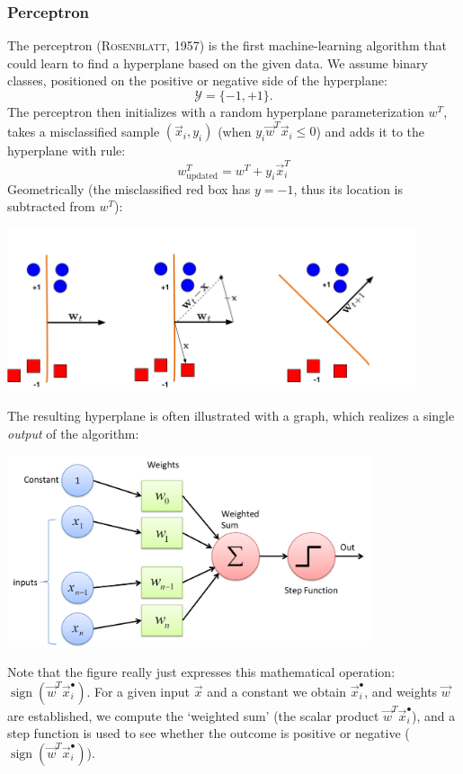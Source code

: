 \documentclass{article}
\DeclareMathOperator{\sign}{sign}
\begin{document}
\subsubsection{Perceptron}
The perceptron (\textsc{Rosenblatt}, 1957) is the first machine-learning algorithm that could learn to find a hyperplane based on the given data. We assume binary classes, positioned on the positive or negative side of the hyperplane:
\begin{equation}
    \mathcal{Y} = \{-1,+1\}.
\end{equation}
The perceptron then initializes with a random hyperplane parameterization $w^T$, takes a misclassified sample $(\vec{x}_i,y_i)$ (when $y_i\vec{w}^T\vec{x}_i\leq 0$) and adds it to the hyperplane with rule:
\begin{equation}
    w^T_\text{updated} = w^T + y_i \vec{x}_i^T
\end{equation}
Geometrically (the misclassified red box has $y=-1$, thus its location is subtracted from $w^T$):
\begin{center}\includegraphics[width=0.9\textwidth,trim={0cm 0cm 3.2cm 2cm},clip]{PerceptronUpdate.png}\end{center}
The resulting hyperplane is often illustrated with a graph, which realizes a single \textit{output} of the algorithm:
\begin{center}\includegraphics[width=0.8\textwidth]{perceptrongraph.png}\end{center}
Note that the figure really just expresses this mathematical operation: $\sign(\vec{w}^T\vec{x}^\bullet_i)$. For a given input $\vec{x}$ and a constant we obtain $\vec{x}^\bullet_i$, and weights $\vec{w}$ are established, we compute the `weighted sum' (the scalar product $\vec{w}^T\vec{x}^\bullet_i$), and a step function is used to see whether the outcome is positive or negative ($\sign(\vec{w}^T\vec{x}^\bullet_i)$).
\end{document}
